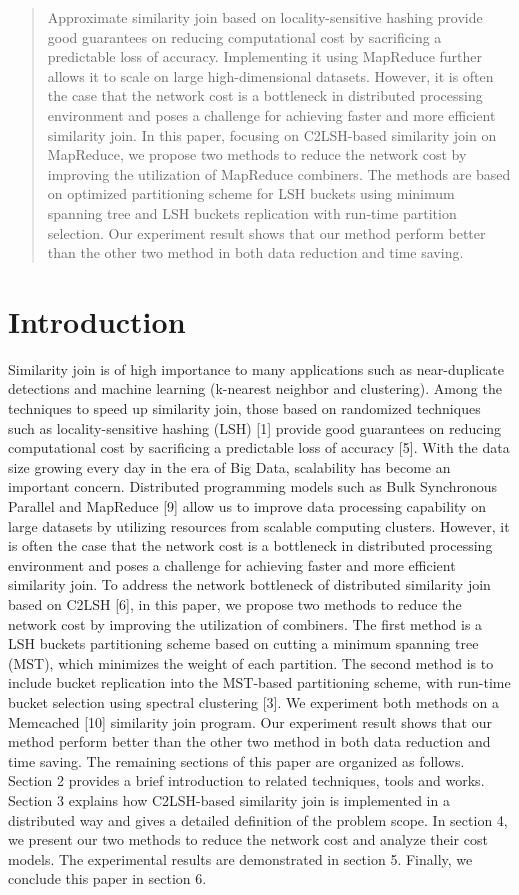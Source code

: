 \documentclass{vldb}
\begin{document}
\begin{abstract}
	Approximate similarity join based on locality-sensitive hashing provide good guarantees on reducing computational cost by sacrificing a predictable loss of accuracy. Implementing it using MapReduce further allows it to scale on large high-dimensional datasets. However, it is often the case that the network cost is a bottleneck in distributed processing environment and poses a challenge for achieving faster and more efficient similarity join. In this paper, focusing on C2LSH-based similarity join on MapReduce, we propose two methods to reduce the network cost by improving the utilization of MapReduce combiners. The methods are based on optimized partitioning scheme for LSH buckets using minimum spanning tree and LSH buckets replication with run-time partition selection. Our experiment result shows that our method perform better than the other two method in both data reduction and time saving.
\end{abstract}




\section{Introduction}
Similarity join is of high importance to many applications such as near-duplicate detections and machine learning (k-nearest neighbor and clustering). Among the techniques to speed up similarity join, those based on randomized techniques such as locality-sensitive hashing (LSH) [1] provide good guarantees on reducing computational cost by sacrificing a predictable loss of accuracy [5].
With the data size growing every day in the era of Big Data, scalability has become an important concern. Distributed programming models such as Bulk Synchronous Parallel and MapReduce [9] allow us to improve data processing capability on large datasets by utilizing resources from scalable computing clusters. However, it is often the case that the network cost is a bottleneck in distributed processing environment and poses a challenge for achieving faster and more efficient similarity join.
To address the network bottleneck of distributed similarity join based on C2LSH [6], in this paper, we propose two methods to reduce the network cost by improving the utilization of combiners. The first method is a LSH buckets partitioning scheme based on cutting a minimum spanning tree (MST), which minimizes the weight of each partition. The second method is to include bucket replication into the MST-based partitioning scheme, with run-time bucket selection using spectral clustering [3]. We experiment both methods on a Memcached [10] similarity join program. Our experiment result shows that our method perform better than the other two method in both data reduction and time saving.
	The remaining sections of this paper are organized as follows. Section 2 provides a brief introduction to related techniques, tools and works. Section 3 explains how C2LSH-based similarity join is implemented in a distributed way and gives a detailed definition of the problem scope. In section 4, we present our two methods to reduce the network cost and analyze their cost models. The experimental results are demonstrated in section 5. Finally, we conclude this paper in section 6.
\end{document}
